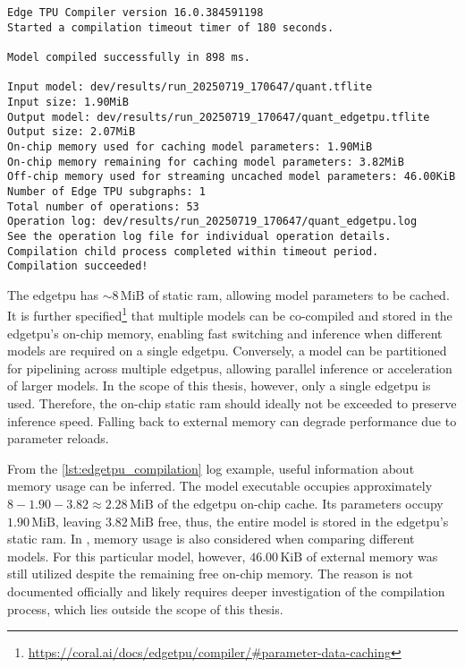 {\begin{lstlisting}[style=compilerlog,
    caption={Edge TPU compiler console output. Successful compilation},
    label={lst:edgetpu_compilation}]
Edge TPU Compiler version 16.0.384591198
Started a compilation timeout timer of 180 seconds.

Model compiled successfully in 898 ms.

Input model: dev/results/run_20250719_170647/quant.tflite
Input size: 1.90MiB
Output model: dev/results/run_20250719_170647/quant_edgetpu.tflite
Output size: 2.07MiB
On-chip memory used for caching model parameters: 1.90MiB
On-chip memory remaining for caching model parameters: 3.82MiB
Off-chip memory used for streaming uncached model parameters: 46.00KiB
Number of Edge TPU subgraphs: 1
Total number of operations: 53
Operation log: dev/results/run_20250719_170647/quant_edgetpu.log
See the operation log file for individual operation details.
Compilation child process completed within timeout period.
Compilation succeeded!
\end{lstlisting}

The \gls{edgetpu} has \(\sim 8\,\mathrm{MiB}\) of static \gls{ram}, allowing model parameters to be cached.
It is further specified\footnote{\url{https://coral.ai/docs/edgetpu/compiler/\#parameter-data-caching}} that multiple models can be co-compiled and
stored in the \gls{edgetpu}'s on-chip memory, enabling fast switching and inference when different models are required on a single \gls{edgetpu}.
Conversely, a model can be partitioned for pipelining across multiple \glspl{edgetpu}, allowing parallel inference or acceleration of larger models.
In the scope of this thesis, however, only a single \gls{edgetpu} is used.
Therefore, the on-chip static \gls{ram} should ideally not be exceeded to preserve inference speed.
Falling back to external memory can degrade performance due to parameter reloads.

From the \autoref{lst:edgetpu_compilation} log example, useful information about memory usage can be inferred.
The model executable occupies approximately \(8 - 1.90 - 3.82 \approx 2.28\,\mathrm{MiB}\) of the \gls{edgetpu} on-chip cache.
Its parameters occupy \(1.90\,\mathrm{MiB}\), leaving \(3.82\,\mathrm{MiB}\) free, thus, the entire model is stored in the \gls{edgetpu}'s static \gls{ram}.
In , memory usage is also considered when comparing different models.
For this particular model, however, \(46.00\,\mathrm{KiB}\) of external memory was still utilized despite the remaining free on-chip memory.
The reason is not documented officially and likely requires deeper investigation of the compilation process, which lies outside the scope of this thesis.

}
